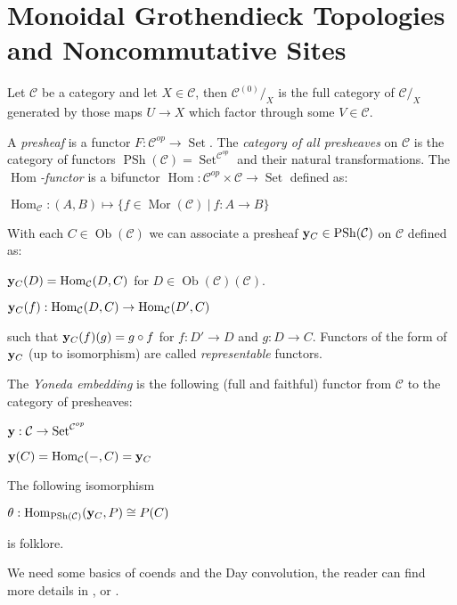 \documentclass[8pt]{article}
\theoremstyle{definition}
\theoremstyle{definition}
\theoremstyle{definition}
\theoremstyle{definition}
\theoremstyle{definition}
\theoremstyle{definition}
\theoremstyle{definition}
\theoremstyle{definition}
\theoremstyle{definition}
\theoremstyle{definition}
\theoremstyle{definition}
\theoremstyle{definition}
\theoremstyle{definition}
\theoremstyle{question}
\newcommand{\Ob}[1]{\operatorname{Ob}({\mathcal{#1}})}
\begin{document}
\section{Monoidal Grothendieck Topologies and Noncommutative Sites}

Let $\mathcal{C}$ be a category and let $X \in \mathcal{C}$, then $\mathcal{C}^{(0)}/_X$ is the full category of
$\mathcal{C}/_X$ generated by those maps $U \to X$ which factor through some $V \in \mathcal{C}$.

A \emph{presheaf} is a functor $F : \mathcal{C}^{op} \to \operatorname{Set}$. 
The \emph{category of all presheaves} on $\mathcal{C}$ is the category of functors $\operatorname{PSh}(\mathcal{C}) = \operatorname{Set}^{\mathcal{C}^{op}}$ and their natural transformations.
The \emph{$\operatorname{Hom}$-functor} is a bifunctor $\operatorname{Hom} : \mathcal{C}^{op} \times \mathcal{C} \to \operatorname{Set}$ defined as:
  \begin{center}
    $\operatorname{Hom}_{\mathcal{C}} : (A, B) \mapsto \{ f \in \operatorname{Mor}(\mathcal{C}) \: | \: f : A \to B \}$
  \end{center}
With each $C \in \Ob{C}$ we can associate a presheaf ${\bf y}_C \in \operatorname{PSh}(\mathcal{C})$ on $\mathcal{C}$ defined as:
  \begin{center}
    ${\bf y}_C(D) = \operatorname{Hom}_{\mathcal{C}}(D, C)$ for $D \in \Ob{C}(\mathcal{C})$.

    ${\bf y}_C(f) : \operatorname{Hom}_{\mathcal{C}}(D, C) \to \operatorname{Hom}_{\mathcal{C}}(D', C)$
  \end{center}
 such that ${\bf y}_C(f)(g) = g \circ f$ for $f : D' \to D$ and $g : D \to C$.
Functors of the form of ${\bf y}_C$ (up to isomorphism) are called \emph{representable} functors.

The \emph{Yoneda embedding} is the following (full and faithful) functor from $\mathcal{C}$ to the category of presheaves:
\begin{center}
  ${\bf y} : \mathcal{C} \to \operatorname{Set}^{\mathcal{C}^{op}}$

  ${\bf y}(C) = \operatorname{Hom}_{\mathcal{C}}(-, C) = {\bf y}_C$
\end{center}

The following isomorphism
\begin{center}
  $\theta : \operatorname{Hom}_{\operatorname{PSh}(\mathcal{C})}({\bf y}_C, P) \cong P(C)$
\end{center}
is folklore.

We need some basics of coends and the Day convolution, the reader can find more details in 
\cite{loregian2021co}, \cite[Chapter 1]{riehl2014categorical} or \cite[Chapter 6]{borceux1994handbook}.
\end{document}
